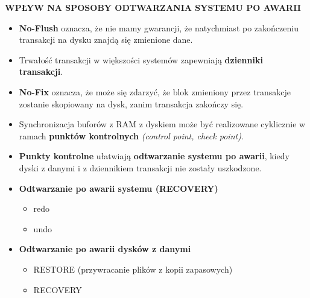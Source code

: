\documentclass[a5paper,6pt]{article}
\begin{document}
    \textbf{WPŁYW NA SPOSOBY ODTWARZANIA SYSTEMU PO AWARII}
    \begin{itemize}
        \item \textbf{No-Flush} oznacza, że nie mamy gwarancji, że natychmiast
              po zakończeniu transakcji na dysku znajdą się zmienione dane.
        \item Trwałość transakcji w większości systemów zapewniają
              \textbf{dzienniki transakcji}.
        \item \textbf{No-Fix} oznacza, że może się zdarzyć, że blok zmieniony
              przez transakcje zostanie skopiowany na dysk, zanim transakcja
              zakończy się.
        \item Synchronizacja buforów z RAM z dyskiem może być realizowane
              cyklicznie w ramach \textbf{punktów kontrolnych}
              \textit{(control point, check point)}.
        \item \textbf{Punkty kontrolne} ułatwiają \textbf{odtwarzanie systemu
              po awarii}, kiedy dyski z danymi i z dziennikiem transakcji nie
              zostały uszkodzone.

        \item \textbf{Odtwarzanie po awarii systemu (RECOVERY)}
        \begin{itemize}
            \item redo
            \item undo
        \end{itemize}

        \item \textbf{Odtwarzanie po awarii dysków z danymi}
        \begin{itemize}
            \item RESTORE (przywracanie plików z kopii zapasowych)
            \item RECOVERY
        \end{itemize}
    \end{itemize}
\end{document}
